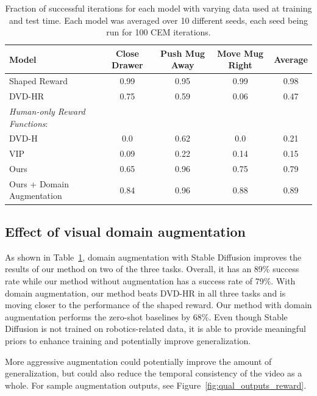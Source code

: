 \begin{table}[t]
    \centering
    \resizebox{\linewidth}{!}
    {%
        \begin{tabular}{lcccc}
        \toprule
        Model & Close Drawer & Push Mug Away & Move Mug Right & Average \\
        \midrule\midrule
        Shaped Reward & 0.99 & 0.95 & 0.99 & 0.98 \\
        DVD-HR \cite{DVD} & 0.75 & 0.59 & 0.06 & 0.47 \\
        \midrule
        \textit{Human-only Reward Functions}: \\
        DVD-H \cite{DVD} & 0.0 & 0.62 & 0.0 & 0.21 \\
        VIP \cite{VIP} & 0.09 & 0.22 & 0.14 & 0.15 \\
        \midrule
        Ours & 0.65 & 0.96 & 0.75 & 0.79 \\
        Ours + Domain Augmentation & 0.84 & 0.96 & 0.88 & 0.89 \\
        \bottomrule
        \end{tabular}
    }
    \vspace{0.05in}
    \caption{Fraction of successful iterations for each model with varying data used at training and test time. Each model was averaged over 10 different seeds, each seed being run for 100 CEM iterations.}
    \label{table:baseline_comparison_reward}
\end{table}

\subsection{Effect of visual domain augmentation}

As shown in Table~\ref{table:baseline_comparison_reward}, domain augmentation with Stable Diffusion improves the results of our method on two of the three tasks. Overall, it has an 89\% success rate while our method without augmentation has a success rate of 79\%. With domain augmentation, our method beats DVD-HR in all three tasks and is moving closer to the performance of the shaped reward. Our method with domain augmentation performs the zero-shot baselines by 68\%. Even though Stable Diffusion is not trained on robotics-related data, it is able to provide meaningful priors to enhance training and potentially improve generalization.

More aggressive augmentation could potentially improve the amount of generalization, but could also reduce the temporal consistency of the video as a whole. For sample augmentation outputs, see Figure~\ref{fig:qual_outputs_reward}.

